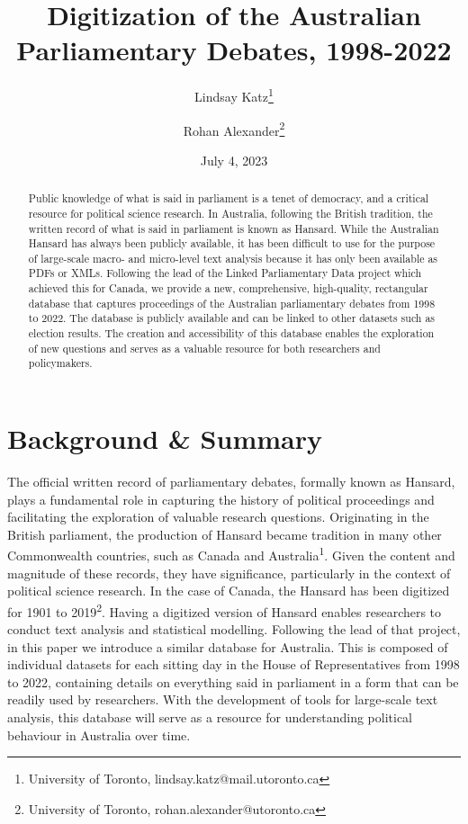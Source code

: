 \documentclass[
  letterpaper,
  DIV=11,
  numbers=noendperiod]{scrartcl}
\title{Digitization of the Australian Parliamentary Debates, 1998-2022}
\author{Lindsay Katz\footnote{University of Toronto,
  lindsay.katz@mail.utoronto.ca} \and Rohan Alexander\footnote{University
  of Toronto, rohan.alexander@utoronto.ca}}
\date{July 4, 2023}
\begin{document}
\maketitle
\begin{abstract}
Public knowledge of what is said in parliament is a tenet of democracy,
and a critical resource for political science research. In Australia,
following the British tradition, the written record of what is said in
parliament is known as Hansard. While the Australian Hansard has always
been publicly available, it has been difficult to use for the purpose of
large-scale macro- and micro-level text analysis because it has only
been available as PDFs or XMLs. Following the lead of the Linked
Parliamentary Data project which achieved this for Canada, we provide a
new, comprehensive, high-quality, rectangular database that captures
proceedings of the Australian parliamentary debates from 1998 to 2022.
The database is publicly available and can be linked to other datasets
such as election results. The creation and accessibility of this
database enables the exploration of new questions and serves as a
valuable resource for both researchers and policymakers.
\end{abstract}
\ifdefined\Shaded\renewenvironment{Shaded}{\begin{tcolorbox}[enhanced, borderline west={3pt}{0pt}{shadecolor}, breakable, sharp corners, boxrule=0pt, interior hidden, frame hidden]}{\end{tcolorbox}}\fi

\hypertarget{sec-intro}{%
\section{Background \& Summary}\label{sec-intro}}

The official written record of parliamentary debates, formally known as
Hansard, plays a fundamental role in capturing the history of political
proceedings and facilitating the exploration of valuable research
questions. Originating in the British parliament, the production of
Hansard became tradition in many other Commonwealth countries, such as
Canada and Australia\textsuperscript{1}. Given the content and magnitude
of these records, they have significance, particularly in the context of
political science research. In the case of Canada, the Hansard has been
digitized for 1901 to 2019\textsuperscript{2}. Having a digitized
version of Hansard enables researchers to conduct text analysis and
statistical modelling. Following the lead of that project, in this paper
we introduce a similar database for Australia. This is composed of
individual datasets for each sitting day in the House of Representatives
from 1998 to 2022, containing details on everything said in parliament
in a form that can be readily used by researchers. With the development
of tools for large-scale text analysis, this database will serve as a
resource for understanding political behaviour in Australia over time.
\end{document}
